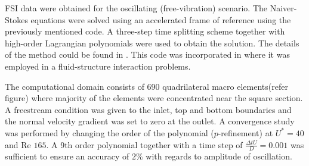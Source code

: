  FSI data were obtained for the oscillating (free-vibration) scenario. The Naiver-Stokes equations were solved using an accelerated frame of reference using the previously mentioned code. A three-step time splitting scheme together with high-order Lagrangian polynomials were used to obtain the solution. The details of the method could be found in \cite{Thompson2006,Thompson1996a}. This code was incorporated in \cite{Leontini2011,Leontini2007a}  where it was employed in a fluid-structure interaction problems. 
 
 The computational domain consists of 690 quadrilateral macro elements(refer figure) where majority of the elements were concentrated near the square section. A freestream condition was given to the inlet, top and bottom boundaries and the normal velocity gradient was set to zero at the outlet. A convergence study was performed by changing the order of the polynomial ($p$-refinement) at $U^*=40$ and Re $165$. A 9th order polynomial together with a time step of $\frac{\Delta tU}{D}=0.001$ was sufficient to ensure an accuracy of $2\%$ with regards to amplitude of oscillation.  
 

 
 
 

 
 
 
 









